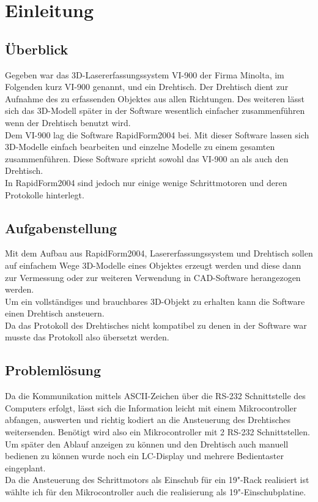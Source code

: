 \documentclass[11pt]{article}
\begin{document}
\tableofcontents 	\newpage
\listoffigures 		\newpage
\listoftables		\newpage
\newpage

\section{Einleitung}
\subsection{Überblick}
Gegeben war das 3D-Lasererfassungssystem VI-900 der Firma Minolta, im Folgenden kurz VI-900 genannt, und ein Drehtisch. Der Drehtisch dient zur Aufnahme des zu erfassenden Objektes aus allen Richtungen. Des weiteren lässt sich das 3D-Modell später in der Software wesentlich einfacher zusammenführen wenn der Drehtisch benutzt wird.\\
Dem VI-900 lag die Software RapidForm2004 bei. Mit dieser Software lassen sich 3D-Modelle einfach bearbeiten und einzelne Modelle zu einem gesamten zusammenführen. Diese Software spricht sowohl das VI-900 an als auch den Drehtisch. \\
In RapidForm2004 sind jedoch nur einige wenige Schrittmotoren und deren Protokolle hinterlegt.
\subsection{Aufgabenstellung}
Mit dem Aufbau aus RapidForm2004, Lasererfassungssystem und Drehtisch sollen auf einfachem Wege 3D-Modelle eines Objektes erzeugt werden und diese dann zur Vermessung oder zur weiteren Verwendung in CAD-Software herangezogen werden.\\
Um ein vollständiges und brauchbares 3D-Objekt zu erhalten kann die Software einen Drehtisch ansteuern.\\
Da das Protokoll des Drehtisches nicht kompatibel zu denen in der Software war musste das Protokoll also übersetzt werden.\\
\subsection{Problemlösung}
Da die Kommunikation mittels ASCII-Zeichen über die RS-232 Schnittstelle des Computers erfolgt, lässt sich die Information leicht mit einem Mikrocontroller abfangen, auswerten und richtig kodiert an die Ansteuerung des Drehtisches weitersenden.
Benötigt wird also ein Mikrocontroller mit 2 RS-232 Schnittstellen. Um später den Ablauf anzeigen zu können und den Drehtisch auch manuell bedienen zu können wurde noch ein LC-Display und mehrere Bedientaster eingeplant.\\
Da die Ansteuerung des Schrittmotors als Einschub für ein 19"-Rack realisiert ist wählte ich für den Mikrocontroller auch die realisierung als 19"-Einschubplatine.
\newpage
\end{document}
